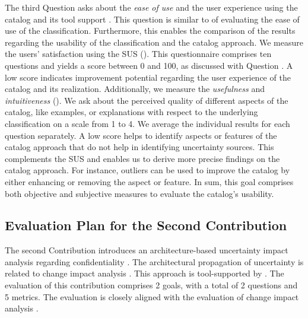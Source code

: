 \label{gqm:text:q:4:3}
The third Question  asks about the \emph{ease of use} and the user experience using the catalog and its tool support \arcen.
This question is similar to  of evaluating the ease of use of the classification.
Furthermore, this enables the comparison of the results regarding the usability of the classification and the catalog approach.
We measure the users' satisfaction  using the \acf{SUS} \cite{lewis_system_2018} (\label{gqm:text:m:4:3:1}).
This questionnaire comprises ten questions and yields a score between 0 and 100, as discussed with Question .
A low score indicates improvement potential regarding the user experience of the catalog and its realization.
Additionally, we measure the \emph{usefulness} and \emph{intuitiveness} (\label{gqm:text:m:4:3:2}).
We ask about the perceived quality of different aspects of the catalog, like examples, or explanations with respect to the underlying classification \cite{hahner_classification_2023} on a scale from 1 to 4.
We average the individual results for each question separately.
A low score helps to identify aspects or features of the catalog approach that do not help in identifying uncertainty sources.
This complements the \ac{SUS} and enables us to derive more precise findings on the catalog approach.
For instance, outliers can be used to improve the catalog by either enhancing or removing the aspect or feature.
In sum, this goal comprises both objective and subjective measures to evaluate the catalog's usability.


\subsection{Evaluation Plan for the Second Contribution}

The second Contribution  introduces an architecture-based uncertainty impact analysis regarding confidentiality \cite{hahner_architecture-based_2023}.
The architectural propagation of uncertainty is related to change impact analysis \cite{rostami_architecture-based_2015,rostami_architecture-based_2017,busch_architecture-based_2020}.
This approach is tool-supported by \uia.
The evaluation of this contribution comprises 2 goals, with a total of 2 questions and 5 metrics.
The evaluation is closely aligned with the evaluation of change impact analysis \cite{rostami_architecture-based_2017}.

